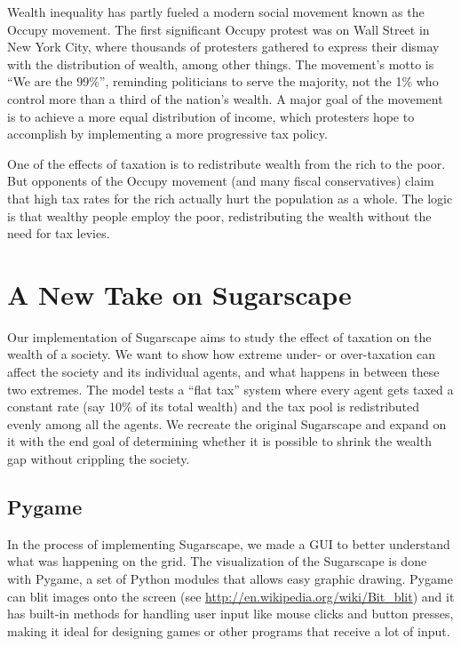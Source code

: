 \documentclass[10pt]{book}
\begin{document}
Wealth inequality has partly fueled a modern social movement known as
the Occupy movement.  The first significant Occupy protest was on Wall
Street in New York City, where thousands of protesters gathered to
express their dismay with the distribution of wealth, among other
things. The movement's motto is ``We are the 99\%'', reminding
politicians to serve the majority, not the 1\% who control more than a
third of the nation's wealth. A major goal of the movement is to
achieve a more equal distribution of income, which protesters hope to
accomplish by implementing a more progressive tax policy.

One of the effects of taxation is to redistribute wealth
from the rich to the poor.  But opponents of the Occupy movement (and
many fiscal conservatives) claim that high tax rates for the
rich actually hurt the population as a whole.  The logic is that
wealthy people employ the poor, redistributing the wealth without the
need for tax levies.


\section{A New Take on Sugarscape}

Our implementation of Sugarscape aims to study the effect of taxation
on the wealth of a society. We want to show how extreme under- or
over-taxation can affect the society and its individual agents, and
what happens in between these two extremes. The model tests a “flat
tax” system where every agent gets taxed a constant rate (say 10\% of
its total wealth) and the tax pool is redistributed evenly among all
the agents. We recreate the original Sugarscape and expand on it with
the end goal of determining whether it is possible to shrink the wealth gap
without crippling the society.


\subsection{Pygame}

In the process of implementing Sugarscape, we made a GUI to better
understand what was happening on the grid. The visualization of the
Sugarscape is done with Pygame, a set of Python modules that allows
easy graphic drawing. Pygame can blit images onto the screen (see
\url{http://en.wikipedia.org/wiki/Bit_blit}) and it has built-in
methods for handling user input like mouse clicks and button presses,
making it ideal for designing games or other programs that receive a
lot of input.
\end{document}
